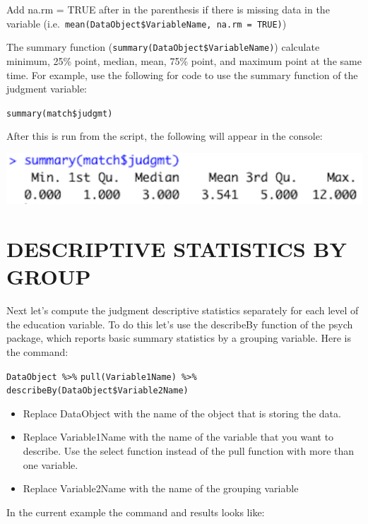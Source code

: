 \documentclass[
]{book}
\newenvironment{Shaded}{\begin{snugshade}}{\end{snugshade}}
\newcommand{\KeywordTok}[1]{\textcolor[rgb]{0.13,0.29,0.53}{\textbf{#1}}}
\newcommand{\NormalTok}[1]{#1}
\newcommand{\OperatorTok}[1]{\textcolor[rgb]{0.81,0.36,0.00}{\textbf{#1}}}
\newcommand{\StringTok}[1]{\textcolor[rgb]{0.31,0.60,0.02}{#1}}
\providecommand{\tightlist}{%
  \setlength{\itemsep}{0pt}\setlength{\parskip}{0pt}}
\begin{document}
Add na.rm = TRUE after in the parenthesis if there is missing data in the variable (i.e.~\texttt{mean(DataObject\$VariableName,\ na.rm\ =\ TRUE)})

The summary function (\texttt{summary(DataObject\$VariableName)}) calculate minimum, 25\% point, median, mean, 75\% point, and maximum point at the same time. For example, use the following for code to use the summary function of the judgment variable:

\texttt{summary(match\$judgmt)}

After this is run from the script, the following will appear in the console:

\includegraphics{img/3R.6.png}

\hypertarget{descriptive-statistics-by-group}{%
\section{DESCRIPTIVE STATISTICS BY GROUP}\label{descriptive-statistics-by-group}}

Next let's compute the judgment descriptive statistics separately for each level of the education variable. To do this let's use the describeBy function of the psych package, which reports basic summary statistics by a grouping variable. Here is the command:

\texttt{DataObject\ \%\textgreater{}\%}
\texttt{pull(Variable1Name)\ \%\textgreater{}\%}
\texttt{describeBy(DataObject\$Variable2Name)}

\begin{itemize}
\tightlist
\item
  Replace DataObject with the name of the object that is storing the data.
\item
  Replace Variable1Name with the name of the variable that you want to describe. Use the select function instead of the pull function with more than one variable.\\
\item
  Replace Variable2Name with the name of the grouping variable
\end{itemize}

In the current example the command and results looks like:

\begin{Shaded}
\end{Shaded}
\end{document}
